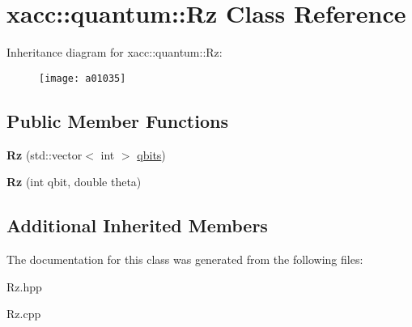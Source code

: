 \hypertarget{a01035}{}\section{xacc\+:\+:quantum\+:\+:Rz Class Reference}
\label{a01035}
Inheritance diagram for xacc\+:\+:quantum\+:\+:Rz\+:\begin{figure}[H]
\begin{center}
\leavevmode
\texttt{[image: a01035]}
\end{center}
\end{figure}
\subsection*{Public Member Functions}
\begin{DoxyCompactItemize}
\item 
\mbox{\label{a01035_a7ce912c7f9c9e8f4e7e60f9dba95538b}} 
{\bfseries Rz} (std\+::vector$<$ int $>$ \hyperlink{a00991_a2a56be6c2519ea65df4d06f4abae1393}{qbits})
\item 
\mbox{\label{a01035_ae30eaf75feb8f896c22043629d21b834}} 
{\bfseries Rz} (int qbit, double theta)
\end{DoxyCompactItemize}
\subsection*{Additional Inherited Members}


The documentation for this class was generated from the following files\+:\begin{DoxyCompactItemize}
\item 
Rz.\+hpp\item 
Rz.\+cpp\end{DoxyCompactItemize}
